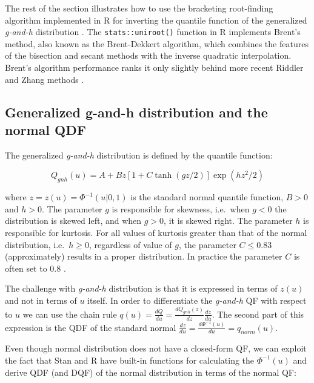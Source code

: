 \documentclass[ba]{imsart}
\numberwithin{equation}{section}
\theoremstyle{plain}
\begin{document}
The rest of the section illustrates how to use the bracketing root-finding algorithm implemented in R for inverting the quantile function of the generalized \emph{g-and-h} distribution \citep{rayner2002NumericalMaximumLikelihood}. The \texttt{stats::uniroot()} function in R implements Brent's method, also known as the Brent-Dekkert algorithm, which combines the features of the bisection and secant methods with the inverse quadratic interpolation. Brent's algorithm performance ranks it only slightly behind more recent Riddler and Zhang methods \citep{stage2013CommentsImprovementBrent, zhang2011ImprovementBrentMethod}.

\hypertarget{generalized-g-and-h-distribution-and-the-normal-qdf}{%
\subsection{Generalized g-and-h distribution and the normal QDF}\label{generalized-g-and-h-distribution-and-the-normal-qdf}}

The generalized \emph{g-and-h} distribution is defined by the quantile function:

\[
Q_{gnh}(u)=A+Bz[1+C\tanh(gz/2)]\exp(hz^2/2)
\]

where \(z=z(u)=\Phi^{-1}(u|0,1)\) is the standard normal quantile function, \(B>0\) and \(h>0\). The parameter \(g\) is responsible for skewness, i.e.~when \(g<0\) the distribution is skewed left, and when \(g>0\), it is skewed right. The parameter \(h\) is responsible for kurtosis. For all values of kurtosis greater than that of the normal distribution, i.e.~\(h\geq 0\), regardless of value of \(g\), the parameter \(C \leq 0.83\) (approximately) results in a proper distribution. In practice the parameter \(C\) is often set to 0.8 \citep{haynes2005BayesianEstimationGandk, rayner2002NumericalMaximumLikelihood}.

The challenge with \emph{g-and-h} distribution is that it is expressed in terms of \(z(u)\) and not in terms of \(u\) itself. In order to differentiate the \emph{g-and-h} QF with respect to \(u\) we can use the chain rule \(q(u)=\frac{dQ}{du}=\frac{dQ_{gnh}(z)}{dz}\frac{dz}{du}\). The second part of this expression is the QDF of the standard normal \(\frac{dz}{du}=\frac{d\Phi^{-1}(u)}{du}=q_{norm}(u)\).

Even though normal distribution does not have a closed-form QF, we can exploit the fact that Stan and R have built-in functions for calculating the \(\Phi^{-1}(u)\) and derive QDF (and DQF) of the normal distribution in terms of the normal QF:
\end{document}
